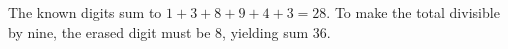 The known digits sum to $1+3+8+9+4+3=28$. To make the total divisible by nine, the erased digit must be $\boxed8$, yielding sum 36.
